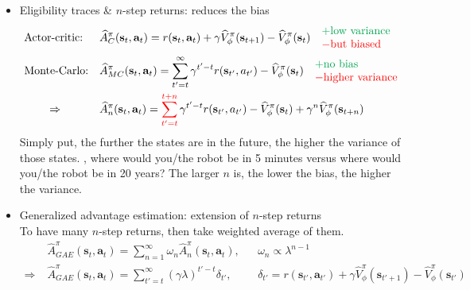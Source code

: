 \begin{itemize}
	\item Eligibility traces \& $n$-step returns: reduces the bias
	\begin{align}
		&\text{Actor-critic:} &&\widehat{A}_C^\pi(\textbf{s}_t, \textbf{a}_t) = r(\textbf{s}_t, \textbf{a}_t) + \gamma \widehat{V}_\phi^\pi(\textbf{s}_{t+1}) - \widehat{V}_\phi^\pi(\textbf{s}_t) \quad \begin{matrix*}[l]
			{\color{Green} + \text{low variance}}\\
			{\color{red} - \text{but biased}}
		\end{matrix*}\\
		&\text{Monte-Carlo:} &&\widehat{A}_{MC}^\pi(\textbf{s}_t, \textbf{a}_t) = \sum_{t' = t}^\infty \gamma^{t'-t} r(\textbf{s}_{t'}, a_{t'}) - \widehat{V}_\phi^\pi(\textbf{s}_t) \quad\begin{matrix*}[l]
			{\color{Green} + \text{no bias}}\\
			{\color{red} - \text{higher variance}}				
		\end{matrix*}\\
		&\qquad\Rightarrow &&\widehat{A}_n^\pi (\textbf{s}_t, \textbf{a}_t) = \sum_{t'=t}^{\color{red} t+n} \gamma^{t'-t} r(\textbf{s}_{t'}, a_{t'}) - \widehat{V}_\phi^\pi(\textbf{s}_t) + \gamma^n \widehat{V}_\phi^\pi(\textbf{s}_{t+n})
	\end{align}
	Simply put, the further the states are in the future, the higher the variance of those states. \Eg, where would you/the robot be in 5 minutes versus where would you/the robot be in 20 years? The larger $n$ is, the lower the bias, the higher the variance.
	\item Generalized advantage estimation: extension of $n$-step returns\\
	To have many $n$-step returns, then take weighted average of them.	
	\begin{align}
		&\widehat{A}_{GAE}^\pi(\textbf{s}_t, \textbf{a}_t) = \sum_{n=1}^\infty \omega_n \widehat{A}_n^\pi(\textbf{s}_t, \textbf{a}_t), && \omega_n \propto \lambda^{n-1}\\
		\Rightarrow\;&\widehat{A}_{GAE}^\pi(\textbf{s}_t, \textbf{a}_t) = \sum_{t'=t}^\infty (\gamma\lambda)^{t'-t} \delta_{t'}, && \delta_{t'} = r(\textbf{s}_{t'}, \textbf{a}_{t'}) + \gamma \widehat{V}^\pi_\phi(\textbf{s}_{t'+1}) - \widehat{V}_\phi^\pi(\textbf{s}_{t'})
	\end{align}
\end{itemize}

